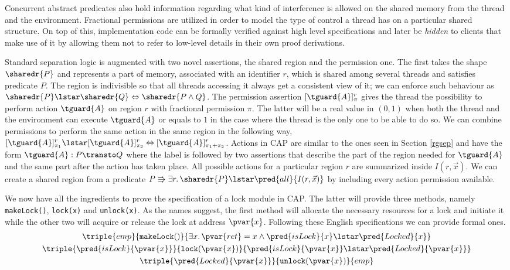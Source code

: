 Concurrent abstract predicates also hold information regarding what kind of interference is allowed on the shared memory from the thread and the environment. Fractional permissions \cite{fractional} are utilized in order to model the type of control a thread has on a particular shared structure. On top of this, implementation code can be formally verified against high level specifications and later be \textit{hidden} to clients that make use of it by allowing them not to refer to low-level details in their own proof derivations.

Standard separation logic is augmented with two novel assertions, the shared region and the permission one. The first takes the shape $\sharedr{P}$ and represents a part of memory, associated with an identifier $r$, which is shared among several threads and satisfies predicate $P$. The region is indivisible so that all threads accessing it always get a consistent view of it; we can enforce such behaviour as $\sharedr{P} \lstar \sharedr{Q} \Leftrightarrow \sharedr{P \land Q}$. The permission assertion $[\tguard{A}]_\pi^r$ gives the thread the possibility to perform action $\tguard{A}$ on region $r$ with fractional permission $\pi$. The latter will be a real value in $(0, 1)$ when both the thread and the environment can execute $\tguard{A}$ or equals to $1$ in the case where the thread is the only one to be able to do so. We can combine permissions to perform the same action in the same region in the following way, $[\tguard{A}]_{\pi_1}^r \lstar [\tguard{A}]_{\pi_2}^r \Leftrightarrow [\tguard{A}]_{\pi_1 + \pi_2}^r$. Actions in CAP are similar to the ones seen in Section \ref{rgsep} and have the form $\tguard{A}: P \transto Q$ where the label is followed by two assertions that describe the part of the region needed for $\tguard{A}$ and the same part after the action has taken place. All possible actions for a particular region $r$ are summarized inside $I(r, \vec{x})$. We can create a shared region from a predicate $P \Rrightarrow \exists r \ldotp \sharedr{P} \lstar \pred{all}{I(r, \vec{x})}$ by including every action permission available.

We now have all the ingredients to prove the specification \cite{cap} of a lock module in CAP. The latter will provide three methods, namely \texttt{makeLock()}, \texttt{lock(x)} and \texttt{unlock(x)}. As the names suggest, the first method will allocate the necessary resources for a lock and initiate it while the other two will acquire or release the lock at address $\pvar{x}$. Following these English specifications we can provide formal ones.
\begin{gather*}
\triple
{emp}
{\mathtt{makeLock}()}
{\exists x \ldotp \pvar{ret} = x \land \pred{isLock}{x} \lstar \pred{Locked}{x}}
\\
\triple
{\pred{isLock}{\pvar{x}}}
{\mathtt{lock}(\pvar{x})}
{\pred{isLock}{\pvar{x}} \lstar \pred{Locked}{\pvar{x}}}
\\
\triple
{\pred{Locked}{\pvar{x}}}
{\mathtt{unlock}(\pvar{x})}
{emp}
\end{gather*}

